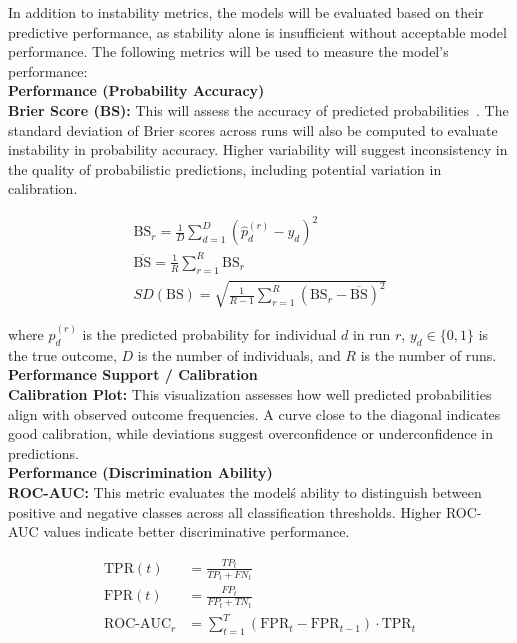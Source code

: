 \documentclass[12pt]{article}
\begin{document}
In addition to instability metrics, the models will be evaluated based on their predictive performance, as stability alone is insufficient without acceptable model performance. The following metrics will be used to measure the model's performance: \\

\textbf{Performance (Probability Accuracy)} \\
\tab \textbf{Brier Score (BS):} This will assess the accuracy of predicted probabilities~\cite{rufibach2010use}. The standard deviation of Brier scores across runs will also be computed to evaluate instability in probability accuracy. Higher variability will suggest inconsistency in the quality of probabilistic predictions, including potential variation in calibration.

\begin{align}
  \text{BS}_r = \frac{1}{D} \sum_{d=1}^{D} \left( \hat{p}_d^{(r)} - y_d \right)^2 \\
  \overline{\text{BS}}=\frac{1}{R}\sum_{r=1}^{R}\text{BS}_r \\
  SD(\text{BS}) = \sqrt{ \frac{1}{R - 1} \sum_{r=1}^{R} \left( \text{BS}_r - \overline{\text{BS}} \right)^2 }
\end{align}

where \( \hat{p}_d^{(r)} \) is the predicted probability for individual \( d \) in run \( r \), \( y_d \in \{0,1\} \) is the true outcome, \( D \) is the number of individuals, and \( R \) is the number of runs.\\

\textbf{Performance Support / Calibration} \\
\tab \textbf{Calibration Plot:} This visualization assesses how well predicted probabilities align with observed outcome frequencies. A curve close to the diagonal indicates good calibration, while deviations suggest overconfidence or underconfidence in predictions.\\

\textbf{Performance (Discrimination Ability)} \\
\tab \textbf{ROC-AUC:} This metric evaluates the model\'s ability to distinguish between positive and negative classes across all classification thresholds. Higher ROC-AUC values indicate better discriminative performance.

\begin{align}
\text{TPR}(t) &= \frac{TP_t}{TP_t + FN_t} \\
\text{FPR}(t) &= \frac{FP_t}{FP_t + TN_t} \\
\text{ROC-AUC}_r &= \sum_{t=1}^{T} (\text{FPR}_t - \text{FPR}_{t-1}) \cdot \text{TPR}_t
\end{align}
\end{document}
